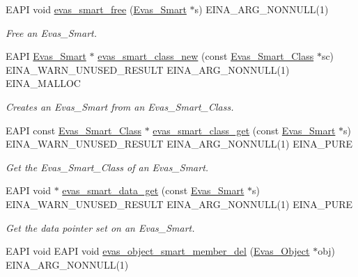 \begin{DoxyCompactItemize}
EAPI void \hyperlink{group__Evas__Smart__Group_ga3501ae449533ae15eee9cbf65811cad2}{evas\_\-smart\_\-free} (\hyperlink{Evas_8h_a7cdfd1afece1cad64c413eb9a778ddbb}{Evas\_\-Smart} $\ast$s) EINA\_\-ARG\_\-NONNULL(1)
\begin{DoxyCompactList}\small\item\em Free an Evas\_\-Smart. \item\end{DoxyCompactList}\item 
EAPI \hyperlink{Evas_8h_a7cdfd1afece1cad64c413eb9a778ddbb}{Evas\_\-Smart} $\ast$ \hyperlink{group__Evas__Smart__Group_ga25a97a07a32a460c8c2d55916481dd1a}{evas\_\-smart\_\-class\_\-new} (const \hyperlink{struct__Evas__Smart__Class}{Evas\_\-Smart\_\-Class} $\ast$sc) EINA\_\-WARN\_\-UNUSED\_\-RESULT EINA\_\-ARG\_\-NONNULL(1) EINA\_\-MALLOC
\begin{DoxyCompactList}\small\item\em Creates an Evas\_\-Smart from an Evas\_\-Smart\_\-Class. \item\end{DoxyCompactList}\item 
EAPI const \hyperlink{struct__Evas__Smart__Class}{Evas\_\-Smart\_\-Class} $\ast$ \hyperlink{group__Evas__Smart__Group_gac41799a0e334d515fa8e07313b88c611}{evas\_\-smart\_\-class\_\-get} (const \hyperlink{Evas_8h_a7cdfd1afece1cad64c413eb9a778ddbb}{Evas\_\-Smart} $\ast$s) EINA\_\-WARN\_\-UNUSED\_\-RESULT EINA\_\-ARG\_\-NONNULL(1) EINA\_\-PURE
\begin{DoxyCompactList}\small\item\em Get the Evas\_\-Smart\_\-Class of an Evas\_\-Smart. \item\end{DoxyCompactList}\item 
EAPI void $\ast$ \hyperlink{group__Evas__Smart__Group_gaa88f3f98a71031573b8dfc4bfeac2f64}{evas\_\-smart\_\-data\_\-get} (const \hyperlink{Evas_8h_a7cdfd1afece1cad64c413eb9a778ddbb}{Evas\_\-Smart} $\ast$s) EINA\_\-WARN\_\-UNUSED\_\-RESULT EINA\_\-ARG\_\-NONNULL(1) EINA\_\-PURE
\begin{DoxyCompactList}\small\item\em Get the data pointer set on an Evas\_\-Smart. \item\end{DoxyCompactList}\item 
EAPI void EAPI void \hyperlink{group__Evas__Smart__Object__Group_gaffa3573bd0f16f3eb21c3da8122194f7}{evas\_\-object\_\-smart\_\-member\_\-del} (\hyperlink{group__Evas__Object__Group_ga9e19e6dd1f517a0ba437c0114d3e7c97}{Evas\_\-Object} $\ast$obj) EINA\_\-ARG\_\-NONNULL(1)

\end{DoxyCompactItemize}
